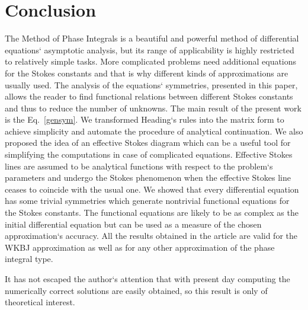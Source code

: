 \documentclass[aps,prl,preprint,superscriptaddress]{revtex4}
\begin{document}

\section{Conclusion \label{CNCLSNS}}

The Method of Phase Integrals is a beautiful and powerful method of differential equations` asymptotic analysis, but its range of applicability is highly restricted to relatively simple tasks. More complicated problems need additional equations for the Stokes constants and that is why different kinds of approximations \cite{white,ours} are usually used. The analysis of the equations` symmetries, presented in this paper, allows the reader to find functional relations between different Stokes constants and thus to reduce the number of unknowns. The main result of the present work is the Eq.~\ref{gensym}. We transformed Heading`s rules \cite{heading,white} into the matrix form to achieve simplicity and automate the procedure of analytical continuation. We also proposed the idea of an effective Stokes diagram which can be a useful tool for simplifying the computations in case of complicated equations. Effective Stokes lines are assumed to be analytical functions with respect to the problem`s parameters and undergo the Stokes phenomenon when the effective Stokes line ceases to coincide with the usual one. We showed that every differential equation has some trivial symmetries which generate nontrivial functional equations for the Stokes constants. The functional equations are likely to be as complex as the initial differential equation but can be used as a measure of the chosen approximation`s accuracy. All the results obtained in the article are valid for the WKBJ approximation as well as for any other approximation of the phase integral type.

It has not escaped the author`s attention that with present day computing the numerically correct solutions are easily obtained, so this result is only of theoretical interest.

\end{document}
